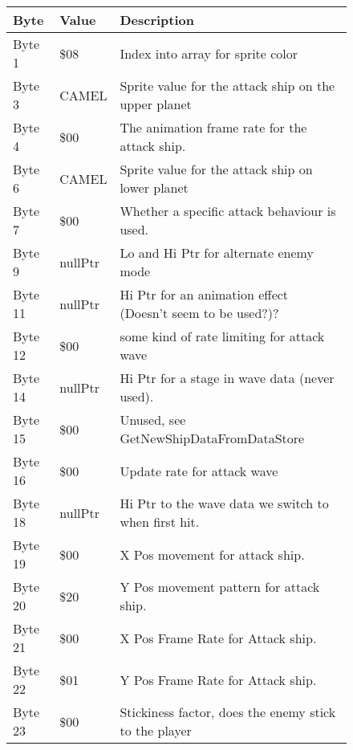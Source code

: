 \begin{figure}[H]
{\begin{adjustbox}{width=12cm}
\begin{tabular}{lll}
\toprule
 Byte    & Value              & Description                                                        \\
\midrule
 Byte 1  & \$08                & Index into array for sprite color                                  \\
 Byte 3  & CAMEL              & Sprite value for the attack ship on the upper planet               \\
 Byte 4  & \$00                & The animation frame rate for the attack ship.                      \\
 Byte 6  & CAMEL              & Sprite value for the attack ship on lower planet                   \\
 Byte 7  & \$00                & Whether a specific attack behaviour is used.                       \\
 Byte 9  & nullPtr            & Lo and Hi Ptr for alternate enemy mode                             \\
 Byte 11 & nullPtr            & Hi Ptr for an animation effect (Doesn't seem to be used?)?         \\
 Byte 12 & \$00                & some kind of rate limiting for attack wave                         \\
 Byte 14 & nullPtr            & Hi Ptr for a stage in wave data (never used).                      \\
 Byte 15 & \$00                & Unused, see GetNewShipDataFromDataStore                            \\
 Byte 16 & \$00                & Update rate for attack wave                                        \\
 Byte 18 & nullPtr            & Hi Ptr to the wave data we switch to when first hit.               \\
 Byte 19 & \$00                & X Pos movement for attack ship.                                    \\
 Byte 20 & \$20                & Y Pos movement pattern for attack ship.                            \\
 Byte 21 & \$00                & X Pos Frame Rate for Attack ship.                                  \\
 Byte 22 & \$01                & Y Pos Frame Rate for Attack ship.                                  \\
 Byte 23 & \$00                & Stickiness factor, does the enemy stick to the player              \\

\end{tabular}
\end{adjustbox}}
\end{figure}
